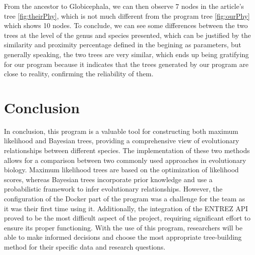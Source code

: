 \documentclass[12pt]{article}
\begin{document}
From the ancestor to Globicephala, we can then observe 7 nodes in the article's tree \ref{fig:theirPhy}, which is not much different from the program tree \ref{fig:ourPhy} which shows 10 nodes.\newline
To conclude, we can see some differences between the two trees at the level of the genus and species presented, which can be justified by the similarity and proximity percentage defined in the begining as parameters, but generally speaking, the two trees are very similar, which ends up being gratifying for our program because it indicates that the trees generated by our program are close to reality, confirming the reliability of them.
\newpage

\section{Conclusion}\label{sec:conclusoes}
In conclusion, this program is a valuable tool for constructing both maximum likelihood and Bayesian trees, providing a comprehensive view of evolutionary relationships between different species. The implementation of these two methods allows for a comparison between two commonly used approaches in evolutionary biology. Maximum likelihood trees are based on the optimization of likelihood scores, whereas Bayesian trees incorporate prior knowledge and use a probabilistic framework to infer evolutionary relationships. However, the configuration of the Docker part of the program was a challenge for the team as it was their first time using it. Additionally, the integration of the ENTREZ API proved to be the most difficult aspect of the project, requiring significant effort to ensure its proper functioning. With the use of this program, researchers will be able to make informed decisions and choose the most appropriate tree-building method for their specific data and research questions.
\end{document}
